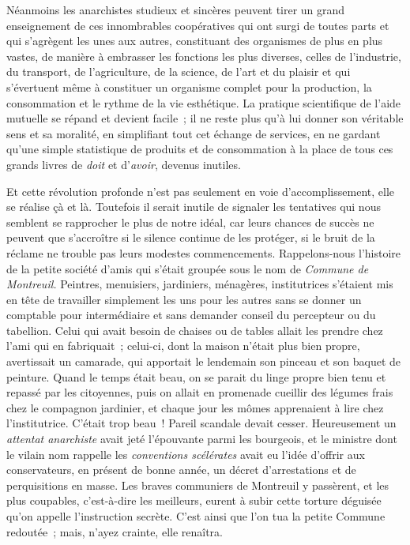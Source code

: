 \documentclass[french,twoside]{book} %
\newcommand\chapterclose{} %
\begin{document}
 Néanmoins les anarchistes studieux et sincères peuvent tirer un grand enseignement de ces innombrables coopératives qui ont surgi de toutes parts et qui s’agrègent les unes aux autres, constituant des organismes de plus en plus vastes, de manière à embrasser les fonctions les plus diverses, celles de l’industrie, du transport, de l’agriculture, de la science, de l’art et du plaisir et qui s’évertuent même à constituer un organisme complet pour la production, la consommation et le rythme de la vie esthétique. La pratique scientifique de l’aide mutuelle se répand et devient facile ; il ne reste plus qu’à lui donner son véritable sens et sa moralité, en simplifiant tout cet échange de services, en ne gardant qu’une simple statistique de produits  et de consommation à la place de tous ces grands livres de \emph{doit} et d’\emph{avoir}, devenus inutiles.\par
Et cette révolution profonde n’est pas seulement en voie d’accomplissement, elle se réalise çà et là. Toutefois il serait inutile de signaler les tentatives qui nous semblent se rapprocher le plus de notre idéal, car leurs chances de succès ne peuvent que s’accroître si le silence continue de les protéger, si le bruit de la réclame ne trouble pas leurs modestes commencements. Rappelons-nous l’histoire de la petite société d’amis qui s’était groupée sous le nom de \emph{Commune de Montreuil.} Peintres, menuisiers, jardiniers, ménagères, institutrices s’étaient mis en tête de travailler simplement les uns pour les autres sans  se donner un comptable pour intermédiaire et sans demander conseil du percepteur ou du tabellion. Celui qui avait besoin de chaises ou de tables allait les prendre chez l’ami qui en fabriquait ; celui-ci, dont la maison n’était plus bien propre, avertissait un camarade, qui apportait le lendemain son pinceau et son baquet de peinture. Quand le temps était beau, on se parait du linge propre bien tenu et repassé par les citoyennes, puis on allait en promenade cueillir des légumes frais chez le compagnon jardinier, et chaque jour les mômes apprenaient à lire chez l’institutrice. C’était trop beau ! Pareil scandale devait cesser. Heureusement un \emph{attentat anarchiste} avait jeté l’épouvante parmi les bourgeois, et le ministre dont le vilain nom  rappelle les \emph{conventions scélérates} avait eu l’idée d’offrir aux conservateurs, en présent de bonne année, un décret d’arrestations et de perquisitions en masse. Les braves communiers de Montreuil y passèrent, et les plus coupables, c’est-à-dire les meilleurs, eurent à subir cette torture déguisée qu’on appelle l’instruction secrète. C’est ainsi que l’on tua la petite Commune redoutée ; mais, n’ayez crainte, elle renaîtra.
\chapterclose
\end{document}
